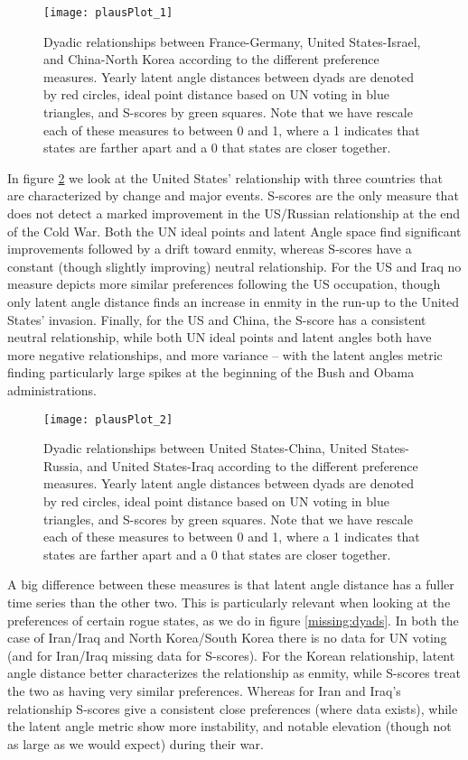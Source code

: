 \begin{figure}
	\centering
	\texttt{[image: plausPlot\_1]}
	\caption{Dyadic relationships between France-Germany, United States-Israel, and China-North Korea according to the different preference measures. Yearly latent angle distances between dyads are denoted by red circles, ideal point distance based on UN voting in blue triangles, and S-scores by green squares. Note that we have rescale each of these measures to between 0 and 1, where a 1 indicates that states are farther apart and a 0 that states are closer together.}
	\label{friendly:dyads}
\end{figure}

In figure \ref{unfriendly:dyads} we look at the United States' relationship with three countries that are characterized by change and major events. S-scores are the only measure that does not detect a marked improvement in the US/Russian relationship at the end of the Cold War. Both the UN ideal points and latent Angle space find significant improvements followed by a drift toward enmity, whereas S-scores have a constant (though slightly improving) neutral relationship. For the US and Iraq no measure depicts more similar preferences following the US occupation, though only latent angle distance finds an increase in enmity in the run-up to the United States' invasion. Finally, for the US and China, the S-score has a consistent neutral relationship, while both UN ideal points and latent angles both have more negative relationships, and more variance -- with the latent angles metric finding particularly large spikes at the beginning of the Bush and Obama administrations.

\begin{figure}
	\centering
	\texttt{[image: plausPlot\_2]}
	\caption{Dyadic relationships between United States-China, United States-Russia, and United States-Iraq according to the different preference measures. Yearly latent angle distances between dyads are denoted by red circles, ideal point distance based on UN voting in blue triangles, and S-scores by green squares. Note that we have rescale each of these measures to between 0 and 1, where a 1 indicates that states are farther apart and a 0 that states are closer together.}
	\label{unfriendly:dyads}
\end{figure}

A big difference between these measures is that latent angle distance has a fuller time series than the other two. This is particularly relevant when looking at the preferences of certain rogue states, as we do in figure \ref{missing:dyads}. In both the case of Iran/Iraq and North Korea/South Korea there is no data for UN voting (and for Iran/Iraq missing data for S-scores). For the Korean relationship, latent angle distance better characterizes the relationship as enmity, while S-scores treat the two as having very similar preferences. Whereas for Iran and Iraq's relationship S-scores give a consistent close preferences (where data exists), while the latent angle metric show more instability, and notable elevation (though not as large as we would expect) during their war.


